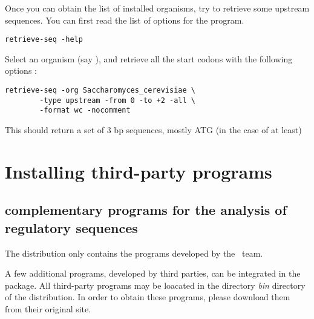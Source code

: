 \documentclass{book}
\begin{document}
Once you can obtain the list of installed organisms, try to retrieve
some upstream sequences. You can first read the list of options for the
 program.

\begin{footnotesize}
\begin{verbatim}
retrieve-seq -help
\end{verbatim}
\end{footnotesize}


Select an organism (say ), and
retrieve all the start codons with the following options :

\begin{footnotesize}
\begin{verbatim}
retrieve-seq -org Saccharomyces_cerevisiae \
        -type upstream -from 0 -to +2 -all \
        -format wc -nocomment
\end{verbatim}
\end{footnotesize}


This should return a set of 3 bp sequences, mostly ATG (in the case of
 at least)





\chapter{Installing third-party programs}

\section{complementary programs for the analysis of regulatory
  sequences}

The \RSAT distribution only contains the programs developed by the
\RSAT \ team. 

A few additional programs, developed by third parties, can be
integrated in the package. All third-party programs may be loacated in
the directory \emph{bin} directory of the \RSAT distribution. In order
to obtain these programs, please download them from their original
site.
\end{document}
